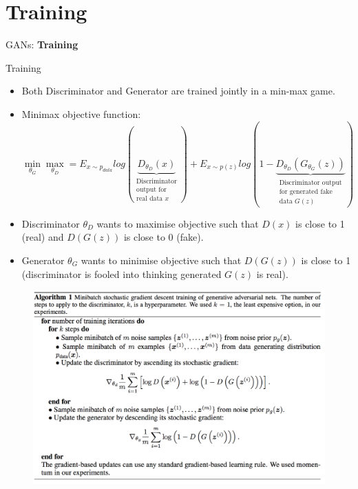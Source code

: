\section{Training}
\begin{frame}{}
    \LARGE GANs: \textbf{Training}
\end{frame}

\begin{frame}[allowframebreaks]{Training}
\begin{itemize}
    \item Both Discriminator and Generator are trained jointly in a min-max game.
    \item Minimax objective function:
    $$\min_{\theta_G} \max_{\theta_D} = E_{x \sim p_{data}} log(\underbrace{D_{\theta_D}(x)}_{\substack{\text{Discriminator}\\ \text{output for}\\ \text{real data }x}}) + E_{x \sim p(z)} log(1-\underbrace{D_{\theta_D}(G_{\theta_G}(z))}_{\substack{\text{Discriminator output}\\ \text{for generated fake}\\ \text{data } G(z)}})$$
    \item Discriminator $\theta_D$ wants to maximise objective such that $D(x)$ is close to 1 (real) and $D(G(z))$ is close to 0 (fake).
    \item Generator $\theta_G$ wants to minimise objective such that $D(G(z))$ is close to 1 (discriminator is fooled into thinking generated $G(z)$ is real).

\end{itemize}

\framebreak
\begin{figure}
    \centering
    \includegraphics[height=1\textheight, width=1.02\textwidth, keepaspectratio]{images/gan/pseudocode.png}
\end{figure}


\end{frame}
